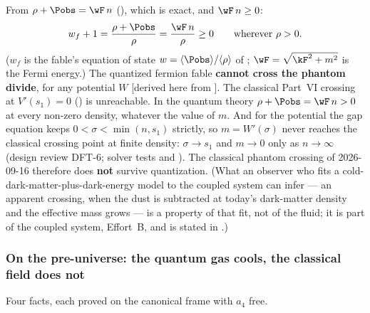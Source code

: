 From $\rho+\Pobs=\wF\,n$ (), which is exact, and $\wF\,n\geq0$:
\[
  w_f+1=\frac{\rho+\Pobs}{\rho}=\frac{\wF\,n}{\rho}\geq0\qquad\text{wherever }\rho>0 .
\]
($w_f$ is the fable's equation of state $w=\langle\Pobs\rangle/\langle\rho\rangle$ of
; $\wF=\sqrt{\kF^2+m^2}$ is the Fermi energy.)
The quantized fermion fable \textbf{cannot cross the phantom divide}, for any potential $W$ [derived
here from ]. The classical Part~VI crossing at $V'(s_1)=0$
() is unreachable. In the quantum theory $\rho+\Pobs=\wF\,n>0$ at every non-zero
density, whatever the value of $m$. And for the  potential the gap equation keeps
$0<\sigma<\min(n,s_1)$ strictly, so $m=W'(\sigma)$ never reaches the classical crossing point at
finite density: $\sigma\to s_1$ and $m\to0$ only as $n\to\infty$ (design review DFT-6; solver tests
 and
). The classical phantom
crossing of 2026-09-16 therefore does \textbf{not} survive quantization. (What an observer who fits a
cold-dark-matter-plus-dark-energy model to the coupled system can infer --- an apparent crossing, when
the dust is subtracted at today's dark-matter density and the effective mass grows --- is a property
of that fit, not of the fluid; it is part of the coupled system, Effort~B, and is stated in
.)

\subsubsection{On the pre-universe: the quantum gas cools, the classical field does not}
\label{sec:3.7.10}

Four facts, each proved on the canonical frame with $a_4$ free.

